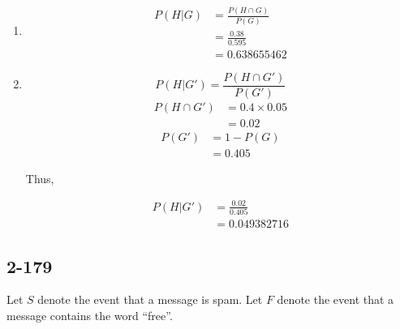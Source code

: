 \documentclass{article}
\begin{document}
\begin{enumerate}[label=(\alph*)]
    \item
        \begin{equation*}
            \begin{aligned}
                P(H \vert G) &= \frac{P(H \cap G)}{P(G)} \\
                &= \frac{0.38}{0.595} \\
                &= 0.638655462
            \end{aligned}
        \end{equation*}

    \item
        \begin{equation*}
            P(H \vert G') = \frac{P(H \cap G')}{P(G')}
        \end{equation*}
        \begin{equation*}
            \begin{aligned}
                P(H \cap G') &= 0.4 \times 0.05 \\
                             &= 0.02
            \end{aligned}
        \end{equation*}
        \begin{equation*}
            \begin{aligned}
                P(G') &= 1 - P(G) \\
                      &= 0.405
            \end{aligned}
        \end{equation*}

        Thus,

        \begin{equation*}
            \begin{aligned}
                P(H \vert G') &= \frac{0.02}{0.405} \\
                              &= 0.049382716
            \end{aligned}
        \end{equation*}
\end{enumerate}

\subsection*{2-179}
Let $S$ denote the event that a message is spam. Let $F$ denote the event that
a message contains the word ``free''.
\end{document}
